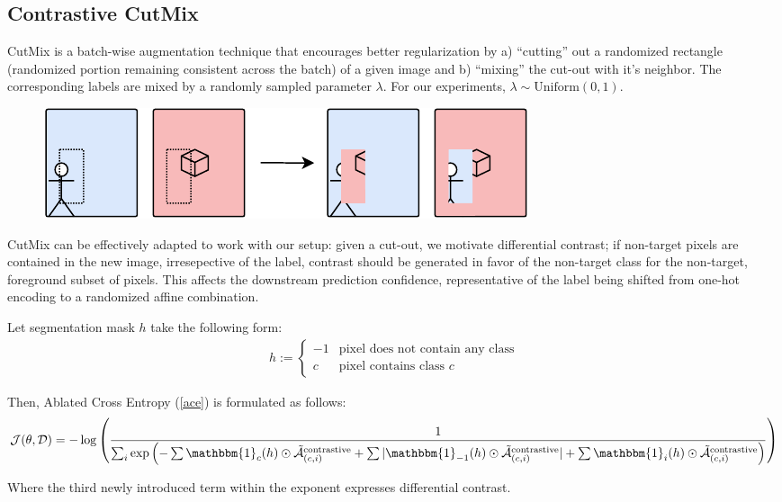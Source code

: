 \documentclass{article}
\theoremstyle{plain}
\theoremstyle{definition}
\theoremstyle{remark}
\begin{document}
\subsection{Contrastive CutMix}

CutMix\cite{yun2019cutmix} is a batch-wise augmentation technique that encourages better regularization by a) ``cutting'' out a randomized rectangle (randomized portion remaining consistent across the batch) of a given image and b) ``mixing'' the cut-out with it's neighbor. The corresponding labels are mixed by a randomly sampled parameter $\lambda$. For our experiments, $\lambda \sim \text{Uniform}(0,1)$.

\begin{figure}[h!]
	\centering
	\includegraphics[width=\textwidth]{img/cutmix}
\end{figure}

CutMix can be effectively adapted to work with our setup: given a cut-out, we motivate differential contrast; if non-target pixels are contained in the new image, irresepective of the label, contrast should be generated in favor of the non-target class for the non-target, foreground subset of pixels. This affects the downstream prediction confidence, representative of the label being shifted from one-hot encoding to a randomized affine combination.

Let segmentation mask $h$ take the following form:
\begin{gather*}
	h := \begin{cases}
		-1 & \text{pixel does not contain any class} \\
		c & \text{pixel contains class } c
	\end{cases}
\end{gather*}

Then, Ablated Cross Entropy (\ref{ace}) is formulated as follows:
\begin{gather}
	\mathcal{J}(\theta, \mathcal{D}) = -\log \left( \frac{1}{\sum_i \text{exp}\left(-\sum \mathbbm{1}_{c}(h) \odot \tilde{\mathcal{\bm{A}}}^{\text{contrastive}}_{(c, i)} + \sum |\mathbbm{1}_{-1}(h) \odot \tilde{\mathcal{\bm{A}}}^{\text{contrastive}}_{(c, i)}| + \sum \mathbbm{1}_{i}(h) \odot \tilde{\mathcal{\bm{A}}}^{\text{contrastive}}_{(c, i)} \right)} \right)
\end{gather}

Where the third newly introduced term within the exponent expresses differential contrast.
\end{document}

